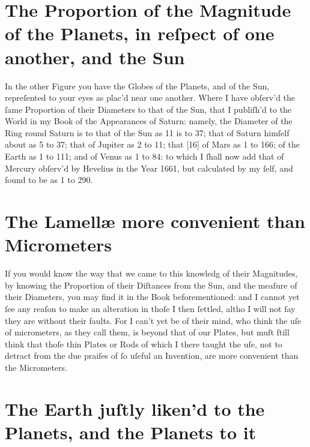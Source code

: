 \documentclass[letterpaper]{book}
\begin{document}
\section{The Proportion of the Magnitude of the Planets, in
reſpect of one another, and the Sun}

In the other Figure you have the Globes of the Planets, and of the Sun,
repreſented to your eyes as plac'd near one another. Where I have obſerv'd
the ſame Proportion of their Diameters to that of the Sun, that I publiſh'd
to the World in my Book of the Appearances of Saturn: namely, the Diameter
of the Ring round Saturn is to that of the Sun as 11 is to 37; that of
Saturn himſelf about as 5 to 37; that of Jupiter as 2 to 11; that [16] of
Mars as 1 to 166; of the Earth as 1 to 111; and of Venus as 1 to 84: to
which I ſhall now add that of Mercury obſerv'd by Hevelius in the Year 1661,
but calculated by my ſelf, and found to be as 1 to 290.


\section{The Lamellæ more convenient than Micrometers}

If you would know the way that we came to this knowledg of their Magnitudes,
by knowing the Proportion of their Diſtances from the Sun, and the meaſure of
their Diameters, you may find it in the Book beforementioned: and I cannot yet
ſee any reaſon to make an alteration in thoſe I then ſettled, altho I will not
ſay they are without their faults.  For I can't yet be of their mind, who
think the uſe of micrometers, as they call them, is beyond that of our Plates,
but muſt ſtill think that thoſe thin Plates or Rods of which I there taught
the uſe, not to detract from the due praiſes of ſo uſeful an Invention, are
more convenient than the Micrometers.


\section{The Earth juſtly liken'd to the Planets, and the
Planets to it}
\end{document}
